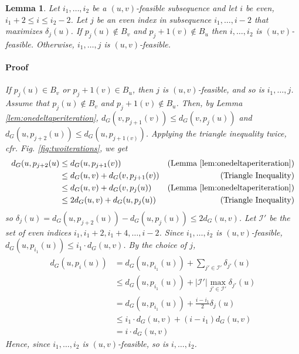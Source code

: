 \documentclass[12pt]{article}
\newtheorem{lem}[thm]{Lemma}
\begin{document}

\begin{lem}
Let $i_1, \hdots, i_2$ be a $(u,v)$-feasible subsequence and let $i$ be even, $i_1+2 \leq i \leq i_2-2$. Let $j$ be an even index in subsequence $i_1, \hdots ,i-2$ that maximizes $\delta_j(u)$. If $p_j(u) \not\in B_v$ and $p_j+1(v) \not\in B_u$ then $i, \hdots , i_2$ is $(u,v)$-feasible. Otherwise, $i_1, \hdots , j$ is $(u,v)$-feasible.

\paragraph{Proof} If $p_j(u) \in B_v$ or $p_j+1(v) \in B_u$, then $j$ is $(u,v)$-feasible, and so is $i_1, \hdots, j$. Assume that $p_j(u) \not\in B_v$ and $p_j+1(v) \not\in B_u$. Then, by Lemma \ref{lem:onedeltaperiteration}, $d_G(v,p_{j+1}(v)) \leq d_G(v,p_{j}(u))$ and $d_G(u,p_{j+2}(u)) \leq d_G(u,p_{j+1(v)})$. Applying the triangle inequality twice, cfr. Fig. \ref{fig:twoiterations}, we get 
\begin{align*}
d_G(u,p_{j+2}(u) &\leq d_G(u,p_{j+1}(v)) &(\text{Lemma \ref{lem:onedeltaperiteration}}) \\
&\leq d_G(u,v) + d_G(v, p_{j+1}(v)) &(\text{Triangle Inequality})\\
&\leq d_G(u,v) + d_G(v, p_{j}(u)) &(\text{Lemma \ref{lem:onedeltaperiteration}})\\
&\leq 2d_G(u,v) + d_G(u, p_{j}(u))&(\text{Triangle Inequality})
\end{align*}
so $\delta_j(u) = d_G(u,p_{j+2}(u)) - d_G(u,p_j(u)) \leq 2d_G(u,v)$. Let $\mathcal{I}'$ be the set of even indices $i_1, i_1+2, i_1+4, \hdots, i-2$. Since $i_1, \hdots, i_2$ is $(u,v)$-feasible, $d_G(u,p_{i_1}(u)) \leq i_1 \cdot d_G(u,v)$. By the choice of $j$,
\begin{align*}
d_G(u,p_{i}(u)) &= d_G(u,p_{i_1}(u)) + \sum_{j' \in \mathcal{I'}}\delta_{j'}(u) \\
&\leq d_G(u,p_{i_1}(u)) + \left| \mathcal{I'} \right| \max_{j' \in \mathcal{I'}}\delta_{j'}(u) \\
&= d_G(u,p_{i_1}(u)) + \frac{i-i_1}{2} \delta_{j}(u) \\
&\leq i_1 \cdot d_G(u,v) + (i-i_1)d_G(u,v) \\
&= i \cdot d_G(u,v)
\end{align*}
Hence, since $i_1, \hdots, i_2$ is $(u,v)$-feasible, so is $i, \hdots, i_2$.  \label{lem:uvfeasibility}
\end{lem}
\end{document}
